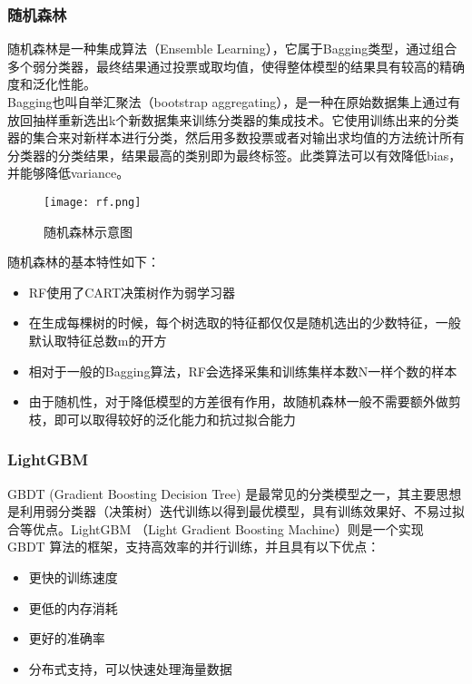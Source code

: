 \subsubsection{随机森林}
随机森林是一种集成算法（Ensemble Learning），它属于Bagging类型，通过组合多个弱分类器，最终结果通过投票或取均值，使得整体模型的结果具有较高的精确度和泛化性能。\\

Bagging也叫自举汇聚法（bootstrap aggregating），是一种在原始数据集上通过有放回抽样重新选出k个新数据集来训练分类器的集成技术。它使用训练出来的分类器的集合来对新样本进行分类，然后用多数投票或者对输出求均值的方法统计所有分类器的分类结果，结果最高的类别即为最终标签。此类算法可以有效降低bias，并能够降低variance。

\begin{figure}[H]
    \centering
    \texttt{[image: rf.png]}
    \caption{随机森林示意图}
    \label{fig:rf}
\end{figure}

随机森林的基本特性如下：
\begin{itemize}
    \item RF使用了CART决策树作为弱学习器
    \item 在生成每棵树的时候，每个树选取的特征都仅仅是随机选出的少数特征，一般默认取特征总数m的开方
    \item 相对于一般的Bagging算法，RF会选择采集和训练集样本数N一样个数的样本
    \item 由于随机性，对于降低模型的方差很有作用，故随机森林一般不需要额外做剪枝，即可以取得较好的泛化能力和抗过拟合能力
\end{itemize}

\subsubsection{LightGBM}
GBDT (Gradient Boosting Decision Tree) 是最常见的分类模型之一，其主要思想是利用弱分类器（决策树）迭代训练以得到最优模型，具有训练效果好、不易过拟合等优点。LightGBM （Light Gradient Boosting Machine）则是一个实现 GBDT 算法的框架，支持高效率的并行训练，并且具有以下优点：
\begin{itemize}
    \item 更快的训练速度
    \item 更低的内存消耗
    \item 更好的准确率
    \item 分布式支持，可以快速处理海量数据
\end{itemize}

